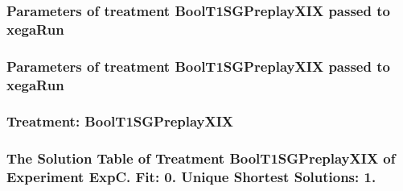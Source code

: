 \documentclass[18pt,c]{beamer}
\begin{document}

 \begin{frame}
 \fontsize{8pt}{9pt}\selectfont
 \frametitle{  Parameters of treatment BoolT1SGPreplayXIX passed to xegaRun
 }

 \label{ExpCtParmTable006.tex}  
 \end{frame}


 \begin{frame}
 \fontsize{8pt}{9pt}\selectfont
 \frametitle{  Parameters of treatment BoolT1SGPreplayXIX passed to xegaRun
 }

 \label{ExpCtParmTable007.tex}  
 \end{frame}

 \begin{frame}
 \fontsize{8pt}{9pt}\selectfont
 \frametitle{ Treatment: BoolT1SGPreplayXIX }

 \label{ExpCStatsTable008.tex}  
 \end{frame}

 \begin{frame}
 \fontsize{8pt}{9pt}\selectfont
 \frametitle{ The Solution Table of Treatment BoolT1SGPreplayXIX of Experiment ExpC. Fit: 0. Unique Shortest Solutions: 1. }

 \label{ExpCSolutionTable001.tex}  
 \end{frame}
\end{document}
